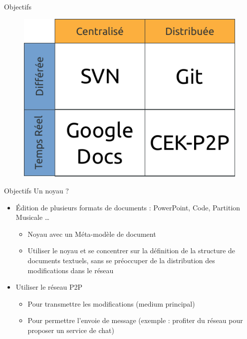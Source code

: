 \begin{frame}{Objectifs}
  \begin{figure}
    \center
    \includegraphics[width=.7\textwidth]{includes/tab2.pdf}
  \end{figure}
\end{frame}

\begin{frame}{Objectifs}
Un noyau ?
\begin{itemize}
  \item Édition de plusieurs formats de documents : PowerPoint, Code, Partition
  Musicale \ldots 
  \begin{itemize}
    \item Noyau avec un Méta-modèle de document
    \item Utiliser le noyau et se concentrer sur la définition de la structure
    de documents textuels, sans se préoccuper de la distribution des
    modifications dans le réseau
  \end{itemize}
  \item Utiliser le réseau P2P
  \begin{itemize}
    \item Pour transmettre les modifications (medium principal) 
    \item Pour permettre l'envoie de message (exemple : profiter du réseau pour
    proposer un service de chat) 
  \end{itemize}
\end{itemize}
\end{frame}

